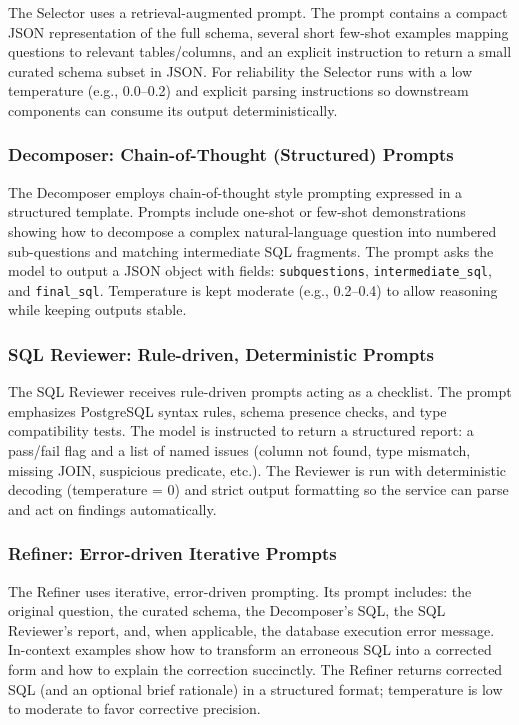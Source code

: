 The Selector uses a retrieval-augmented prompt. The prompt contains a compact JSON representation of the full schema, several short few-shot examples mapping questions to relevant tables/columns, and an explicit instruction to return a small curated schema subset in JSON. For reliability the Selector runs with a low temperature (e.g., 0.0--0.2) and explicit parsing instructions so downstream components can consume its output deterministically.

\subsubsection{Decomposer: Chain-of-Thought (Structured) Prompts}

The Decomposer employs chain-of-thought style prompting expressed in a structured template. Prompts include one-shot or few-shot demonstrations showing how to decompose a complex natural-language question into numbered sub-questions and matching intermediate SQL fragments. The prompt asks the model to output a JSON object with fields: \texttt{subquestions}, \texttt{intermediate\_sql}, and \texttt{final\_sql}. Temperature is kept moderate (e.g., 0.2--0.4) to allow reasoning while keeping outputs stable.

\subsubsection{SQL Reviewer: Rule-driven, Deterministic Prompts}

The SQL Reviewer receives rule-driven prompts acting as a checklist. The prompt emphasizes PostgreSQL syntax rules, schema presence checks, and type compatibility tests. The model is instructed to return a structured report: a pass/fail flag and a list of named issues (column not found, type mismatch, missing JOIN, suspicious predicate, etc.). The Reviewer is run with deterministic decoding (temperature = 0) and strict output formatting so the service can parse and act on findings automatically.

\subsubsection{Refiner: Error-driven Iterative Prompts}

The Refiner uses iterative, error-driven prompting. Its prompt includes: the original question, the curated schema, the Decomposer's SQL, the SQL Reviewer's report, and, when applicable, the database execution error message. In-context examples show how to transform an erroneous SQL into a corrected form and how to explain the correction succinctly. The Refiner returns corrected SQL (and an optional brief rationale) in a structured format; temperature is low to moderate to favor corrective precision.


